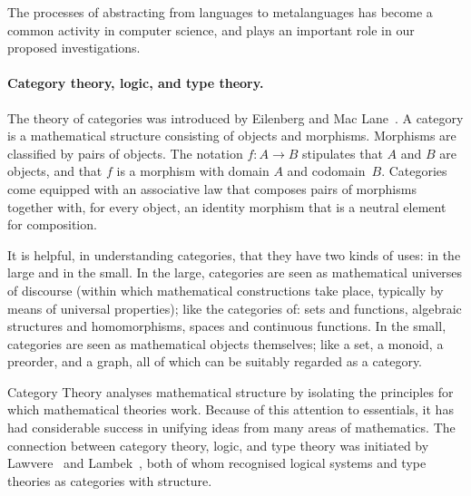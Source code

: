 \documentclass[11pt,twocolumn]{article}
\begin{document}
The processes of abstracting from languages to metalanguages has become a
common activity in computer science, and plays an important role in our
proposed investigations.  

\paragraph{Category theory, logic, and type theory.}

The theory of categories was introduced by Eilenberg and Mac
Lane~\cite{EilenbergMacLane}.  A category is a mathematical structure
consisting of objects and morphisms.  Morphisms are classified
by pairs of objects. The notation $f:A\to B$ stipulates that $A$ and $B$ are objects, and
that $f$ is a morphism with domain $A$ and codomain~$B$.  
Categories come equipped with an associative law that composes pairs of
morphisms 
together with, for every object, an identity morphism 
that is a neutral element for composition.  

It is helpful, in understanding categories, that they have two kinds of uses: in the
large and in the small.  In the large, categories are seen as mathematical
universes of discourse (within which mathematical constructions take place,
typically by means of universal properties); like the categories of: sets and
functions, algebraic structures and homomorphisms, spaces and continuous
functions.  In the small, categories are seen as mathematical objects
themselves; like a set, a monoid, a preorder, and a graph, all of which can
be suitably regarded as a category.

Category Theory analyses mathematical structure by isolating the principles
for which mathematical theories work.  Because of this attention to
essentials, it has had considerable success in unifying ideas from many areas
of mathematics. 
%
The connection between category theory, logic, and type theory was
initiated by Lawvere~\cite{LawvereAinF} and Lambek~\cite{LambekI}, both
of whom recognised logical systems and type theories as categories with
structure.  
\end{document}
